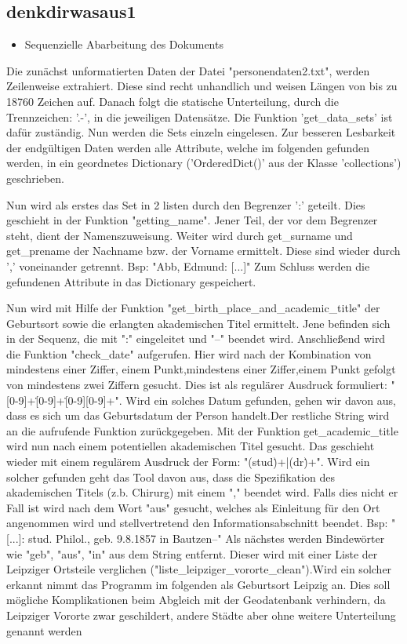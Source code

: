 \subsection{denkdirwasaus1}
 \label{subsec:denkdirwasaus1}

 \begin{itemize}
 \item Sequenzielle Abarbeitung des Dokuments
 \end {itemize}


 Die zunächst unformatierten Daten der Datei "personendaten2.txt", werden Zeilenweise extrahiert. Diese sind recht unhandlich und weisen Längen von bis zu 18760 Zeichen auf.
 Danach folgt die statische Unterteilung, durch die Trennzeichen: '.-', in die jeweiligen Datensätze. Die Funktion 'get_data_sets' ist dafür zuständig.
 Nun werden die Sets einzeln eingelesen. Zur besseren Lesbarkeit der endgültigen Daten werden alle Attribute, welche im folgenden gefunden werden, in ein geordnetes Dictionary ('OrderedDict()' aus der Klasse 'collections') geschrieben.

 Nun wird als erstes das Set in 2 listen durch den Begrenzer ':' geteilt. Dies geschieht in der Funktion "getting_name". Jener Teil, der vor dem Begrenzer steht, dient der Namenszuweisung. Weiter wird durch get_surname und get_prename der Nachname bzw. der Vorname ermittelt. Diese sind wieder durch ',' voneinander getrennt. Bsp: "Abb, Edmund: [...]"
 Zum Schluss werden die gefundenen Attribute in das Dictionary gespeichert.

 Nun wird mit Hilfe der Funktion "get_birth_place_and_academic_title" der Geburtsort sowie die erlangten akademischen Titel ermittelt. Jene befinden sich in der Sequenz, die mit ":" eingeleitet und "--" beendet wird.
 Anschließend wird die Funktion "check_date" aufgerufen. Hier wird nach der Kombination von mindestens einer Ziffer, einem Punkt,mindestens einer Ziffer,einem Punkt gefolgt von mindestens zwei Ziffern gesucht. Dies ist als regulärer Ausdruck formuliert: "[0-9]+\.[0-9]+\.[0-9][0-9]+". Wird ein solches Datum gefunden, gehen wir davon aus, dass es sich um das Geburtsdatum der Person handelt.Der restliche String wird an die aufrufende Funktion zurückgegeben.
 Mit der Funktion get_academic_title wird nun nach einem potentiellen akademischen Titel gesucht. Das geschieht wieder mit einem regulärem Ausdruck der Form: "(stud\.)+|(dr\.)+". Wird ein solcher gefunden geht das Tool davon aus, dass die Spezifikation des akademischen Titels (z.b. Chirurg) mit einem "," beendet wird. Falls dies nicht er Fall ist wird nach dem Wort "aus" gesucht, welches als Einleitung für den Ort angenommen wird und stellvertretend den Informationsabschnitt beendet. Bsp: "[...]: stud. Philol., geb. 9.8.1857 in Bautzen--"
 Als nächstes werden Bindewörter wie "geb", "aus", "in" aus dem String entfernt. Dieser wird mit einer Liste der Leipziger Ortsteile verglichen ("liste_leipziger_vororte_clean").Wird ein solcher erkannt nimmt das Programm im folgenden als Geburtsort Leipzig an. Dies soll mögliche Komplikationen beim Abgleich mit der Geodatenbank verhindern, da Leipziger Vororte zwar geschildert, andere Städte aber ohne weitere Unterteilung genannt werden

